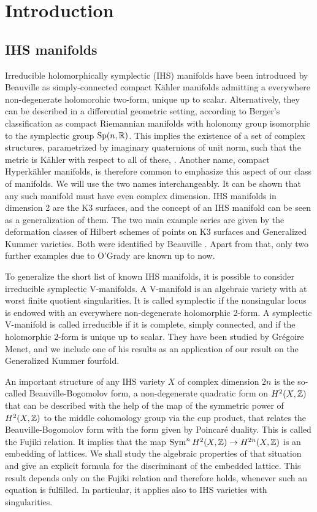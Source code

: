 \section{Introduction}
\subsection{IHS manifolds}
Irreducible holomorphically symplectic (IHS) manifolds have been introduced by Beauville \cite{Beauville} as simply-connected compact K\"ahler manifolds admitting a everywhere non-degenerate holomorohic two-form, unique up to scalar. 
Alternatively, they can be described in a differential geometric setting, according to Berger's classification as compact Riemannian manifolds with holonomy group isomorphic to the symplectic group $\operatorname{Sp}(n,\mathbb{R})$. This implies the existence of a set of complex structures, parametrized by imaginary quaternions of unit norm, such that the metric is K\"ahler with respect to all of these, \cite[Sect~.23]{Huybrechts}. 
Another name, compact Hyperk\"ahler manifolds, is therefore common to emphasize this aspect of our class of manifolds. We will use the two names interchangeably.
It can be shown that any such manifold must have even complex dimension. IHS manifolds in dimension 2 are the K3 surfaces, and the concept of an IHS manifold can be seen as a generalization of them. The two main example series are given by the deformation classes of Hilbert schemes of points on K3 surfaces and Generalized Kummer varieties. Both were identified by Beauville \cite{Beauville}. Apart from that, only two further examples due to O'Grady are known up to now.

To generalize the short list of known IHS manifolds, it is possible to consider irreducible symplectic V-manifolds. A V-manifold is an algebraic variety with at worst finite quotient singularities. It is called symplectic if the nonsingular locus is endowed with an everywhere non-degenerate holomorphic 2-form. 
A symplectic V-manifold is called irreducible if it is complete, simply connected, and if the holomorphic 2-form is unique up to scalar. They have been studied by Gr\'egoire Menet, and we include one of his results as an application of our result on the Generalized Kummer fourfold.

An important structure of any IHS variety $X$ of complex dimension $2n$ is the so-called Beauville-Bogomolov form, a non-degenerate quadratic form on $H^2(X,\mathbb{Z})$ that can be described with the help of the map of the symmetric power of $H^2(X,\mathbb{Z})$ to the middle cohomology group via the cup product, that relates the Beauville-Bogomolov form with the form given by Poincar\'e duality. This is called the Fujiki relation. It implies that the map $\operatorname{Sym}^n H^2(X,\mathbb{Z})\rightarrow H^{2n}(X,\mathbb{Z})$ is an embedding of lattices. We shall study the algebraic properties of that situation and give an explicit formula for the discriminant of the embedded lattice. This result depends only on the Fujiki relation and therefore holds, whenever such an equation is fulfilled. In particular, it applies also to IHS varieties with singularities.

